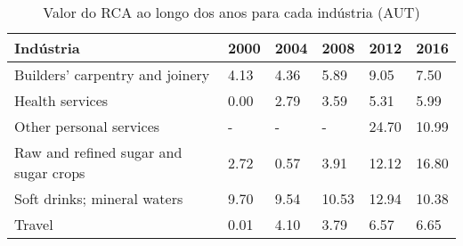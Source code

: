 \begin{table}
\centering
\caption{Valor do RCA ao longo dos anos para cada indústria (AUT)}
\begin{tabular}{p{6cm}p{1.5cm}p{1.5cm}p{1.5cm}p{1.5cm}p{1.5cm}}
\toprule
                            Indústria & 2000 & 2004 &  2008 &  2012 &  2016 \\
\midrule
      Builders' carpentry and joinery & 4.13 & 4.36 &  5.89 &  9.05 &  7.50 \\
                      Health services & 0.00 & 2.79 &  3.59 &  5.31 &  5.99 \\
              Other personal services &    - &    - &     - & 24.70 & 10.99 \\
Raw and refined sugar and sugar crops & 2.72 & 0.57 &  3.91 & 12.12 & 16.80 \\
          Soft drinks; mineral waters & 9.70 & 9.54 & 10.53 & 12.94 & 10.38 \\
                               Travel & 0.01 & 4.10 &  3.79 &  6.57 &  6.65 \\
\bottomrule
\end{tabular}
\end{table}
